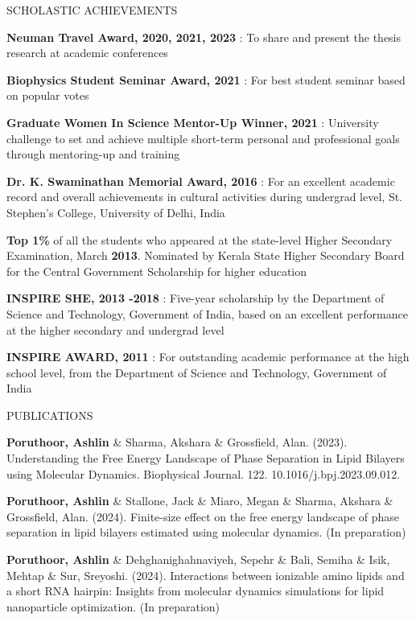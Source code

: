 \documentclass{resume} %
\begin{document}
\begin{rSection}{SCHOLASTIC ACHIEVEMENTS}
   \vspace{-1.25em}
   \item \textbf{Neuman Travel Award, 2020, 2021, 2023} : To share and present the thesis research at academic conferences
   \item \textbf{Biophysics Student Seminar Award, 2021} : For best student seminar based on popular votes
   \item \textbf{Graduate Women In Science Mentor-Up Winner, 2021} : University challenge to set and achieve multiple short-term personal and professional goals through mentoring-up and training
   \item \textbf{Dr. K. Swaminathan Memorial Award, 2016} : For an excellent academic record and overall achievements in cultural activities during undergrad level, St. Stephen's College, University of Delhi, India
   \item \textbf{Top 1\%} of all the students who appeared at the state-level Higher Secondary Examination, March \textbf{2013}. Nominated by Kerala State Higher Secondary Board for the Central Government Scholarship for higher education
   \item \textbf{INSPIRE SHE, 2013 -2018} : Five-year scholarship by the Department of Science and Technology, Government of India, based on an excellent performance at the higher secondary and undergrad level
   \item \textbf{INSPIRE AWARD, 2011} : For outstanding academic performance at the high school level, from the Department of Science and Technology, Government of India

\end{rSection}

\begin{rSection}{PUBLICATIONS}

   \item \textbf{Poruthoor, Ashlin} \& Sharma, Akshara \& Grossfield, Alan. (2023). Understanding the Free Energy Landscape of Phase Separation in Lipid Bilayers using Molecular Dynamics. Biophysical Journal. 122. 10.1016/j.bpj.2023.09.012.
   \item \textbf{Poruthoor, Ashlin} \& Stallone, Jack \& Miaro, Megan \& Sharma, Akshara \& Grossfield, Alan. (2024). Finite-size effect on the free energy landscape of phase separation in lipid bilayers estimated using molecular dynamics. (In preparation)
   \item \textbf{Poruthoor, Ashlin} \& Dehghanighahnaviyeh, Sepehr \& Bali, Semiha \& Isik, Mehtap \& Sur, Sreyoshi. (2024). Interactions between ionizable amino lipids and a short RNA hairpin: Insights from molecular dynamics simulations for lipid nanoparticle optimization. (In preparation)

\end{rSection}
\end{document}
